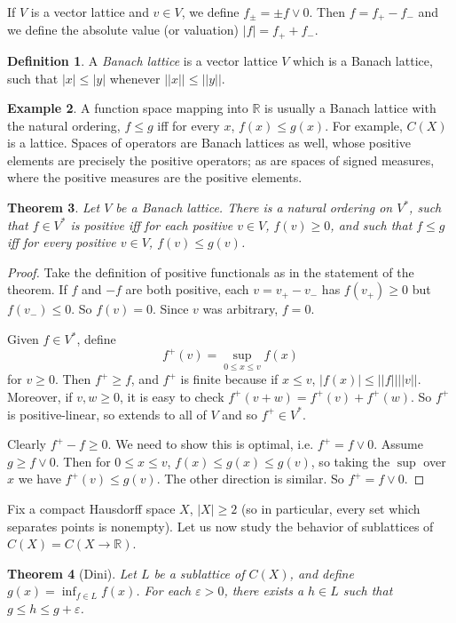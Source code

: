 \documentclass[12pt]{report}
\newcommand{\RR}{\mathbb{R}}
\newcommand{\dfn}[1]{\emph{#1}\index{#1}}
\newtheorem{theorem}{Theorem}[chapter]
\theoremstyle{definition}
\newtheorem{definition}[theorem]{Definition}
\newtheorem{example}[theorem]{Example}
\begin{document}
    If $V$ is a vector lattice and $v \in V$, we define $f_\pm = \pm f \vee 0$. Then $f = f_+ - f_-$ and we define the absolute value (or valuation) $|f| = f_+ + f_-$.
\begin{definition}
    A \dfn{Banach lattice} is a vector lattice $V$ which is a Banach lattice, such that $|x| \leq |y|$ whenever $||x|| \leq ||y||$.
\end{definition}
\begin{example}
    A function space mapping into $\RR$ is usually a Banach lattice with the natural ordering, $f \leq g$ iff for every $x$, $f(x) \leq g(x)$. For example, $C(X)$ is a lattice. Spaces of operators are Banach lattices as well, whose positive elements are precisely the positive operators; as are spaces of signed measures, where the positive measures are the positive elements.
\end{example}
\begin{theorem}
    Let $V$ be a Banach lattice. There is a natural ordering on $V^*$, such that $f \in V^*$ is positive iff for each positive $v \in V$, $f(v) \geq 0$, and such that $f \leq g$ iff for every positive $v \in V$, $f(v) \leq g(v)$.
\end{theorem}
\begin{proof}
    Take the definition of positive functionals as in the statement of the theorem. If $f$ and $-f$ are both positive, each $v = v_+ - v_-$ has $f(v_+) \geq 0$ but $f(v_-) \leq 0$. So $f(v) = 0$. Since $v$ was arbitrary, $f = 0$.
    
    Given $f \in V^*$, define
    $$f^+(v) = \sup_{0 \leq x \leq v} f(x)$$
    for $v \geq 0$. Then $f^+ \geq f$, and $f^+$ is finite because if $x \leq v$, $|f(x)| \leq ||f|| ||v||$. Moreover, if $v, w \geq 0$, it is easy to check $f^+(v+w) = f^+(v) + f^+(w)$. So $f^+$ is positive-linear, so extends to all of $V$ and so $f^+ \in V^*$.
    
    Clearly $f^+ - f \geq 0$. We need to show this is optimal, i.e. $f^+ = f \vee 0$. Assume $g \geq f \vee 0$. Then for $0 \leq x \leq v$, $f(x) \leq g(x) \leq g(v)$, so taking the $\sup$ over $x$ we have $f^+(v) \leq g(v)$. The other direction is similar. So $f^+ = f \vee 0$.
\end{proof}
    Fix a compact Hausdorff space $X$, $|X| \geq 2$ (so in particular, every set which separates points is nonempty). Let us now study the behavior of sublattices of $C(X) = C(X \to \RR)$.
\begin{theorem}[Dini]
    Let $L$ be a sublattice of $C(X)$, and define $g(x) = \inf_{f \in L} f(x)$. For each $\varepsilon > 0$, there exists a $h \in L$ such that $g \leq h \leq g + \varepsilon$.
\end{theorem}
\end{document}
